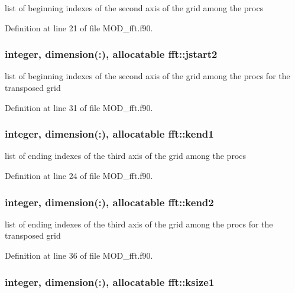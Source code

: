 list of beginning indexes of the second axis of the grid among the procs 



Definition at line 21 of file M\-O\-D\-\_\-fft.\-f90.

\hypertarget{classfft_a78b149c52f191d1999bc349321c63c8f}{
\subsubsection[{jstart2}]{\setlength{\rightskip}{0pt plus 5cm}integer, dimension(\-:), allocatable fft\-::jstart2}}\label{classfft_a78b149c52f191d1999bc349321c63c8f}


list of beginning indexes of the second axis of the grid among the procs for the transposed grid 



Definition at line 31 of file M\-O\-D\-\_\-fft.\-f90.

\hypertarget{classfft_ae7e4ffb85ebf62ef0f2ef10f04e2f0de}{
\subsubsection[{kend1}]{\setlength{\rightskip}{0pt plus 5cm}integer, dimension(\-:), allocatable fft\-::kend1}}\label{classfft_ae7e4ffb85ebf62ef0f2ef10f04e2f0de}


list of ending indexes of the third axis of the grid among the procs 



Definition at line 24 of file M\-O\-D\-\_\-fft.\-f90.

\hypertarget{classfft_a0f6315961060541f8c050b2fa944f28a}{
\subsubsection[{kend2}]{\setlength{\rightskip}{0pt plus 5cm}integer, dimension(\-:), allocatable fft\-::kend2}}\label{classfft_a0f6315961060541f8c050b2fa944f28a}


list of ending indexes of the third axis of the grid among the procs for the transposed grid 



Definition at line 36 of file M\-O\-D\-\_\-fft.\-f90.

\hypertarget{classfft_a737d6288ef056a8d5626686622b05a2e}{
\subsubsection[{ksize1}]{\setlength{\rightskip}{0pt plus 5cm}integer, dimension(\-:), allocatable fft\-::ksize1}}\label{classfft_a737d6288ef056a8d5626686622b05a2e}


